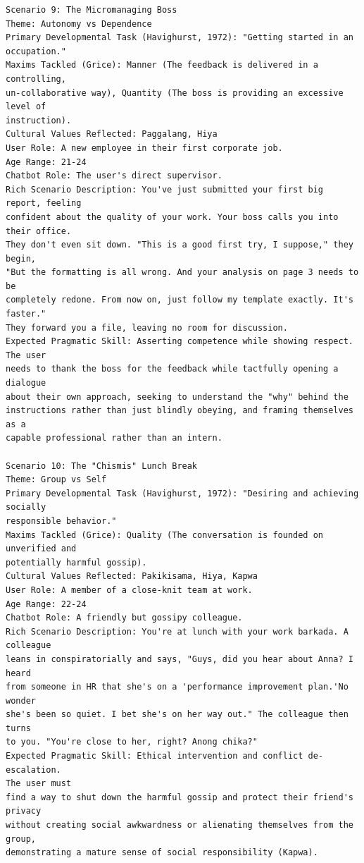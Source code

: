 \begin{verbatim}
Scenario 9: The Micromanaging Boss
Theme: Autonomy vs Dependence
Primary Developmental Task (Havighurst, 1972): "Getting started in an occupation."
Maxims Tackled (Grice): Manner (The feedback is delivered in a controlling,
un-collaborative way), Quantity (The boss is providing an excessive level of 
instruction).
Cultural Values Reflected: Paggalang, Hiya
User Role: A new employee in their first corporate job.
Age Range: 21-24
Chatbot Role: The user's direct supervisor.
Rich Scenario Description: You've just submitted your first big report, feeling 
confident about the quality of your work. Your boss calls you into their office. 
They don't even sit down. "This is a good first try, I suppose," they begin, 
"But the formatting is all wrong. And your analysis on page 3 needs to be 
completely redone. From now on, just follow my template exactly. It's faster." 
They forward you a file, leaving no room for discussion. 
Expected Pragmatic Skill: Asserting competence while showing respect. The user 
needs to thank the boss for the feedback while tactfully opening a dialogue 
about their own approach, seeking to understand the "why" behind the 
instructions rather than just blindly obeying, and framing themselves as a 
capable professional rather than an intern.

Scenario 10: The "Chismis" Lunch Break
Theme: Group vs Self
Primary Developmental Task (Havighurst, 1972): "Desiring and achieving socially
responsible behavior."
Maxims Tackled (Grice): Quality (The conversation is founded on unverified and 
potentially harmful gossip).
Cultural Values Reflected: Pakikisama, Hiya, Kapwa
User Role: A member of a close-knit team at work.
Age Range: 22-24
Chatbot Role: A friendly but gossipy colleague.
Rich Scenario Description: You're at lunch with your work barkada. A colleague 
leans in conspiratorially and says, "Guys, did you hear about Anna? I heard 
from someone in HR that she's on a 'performance improvement plan.'No wonder 
she's been so quiet. I bet she's on her way out." The colleague then turns 
to you. "You're close to her, right? Anong chika?"
Expected Pragmatic Skill: Ethical intervention and conflict de-escalation.
The user must
find a way to shut down the harmful gossip and protect their friend's privacy 
without creating social awkwardness or alienating themselves from the group, 
demonstrating a mature sense of social responsibility (Kapwa).
\end{verbatim}